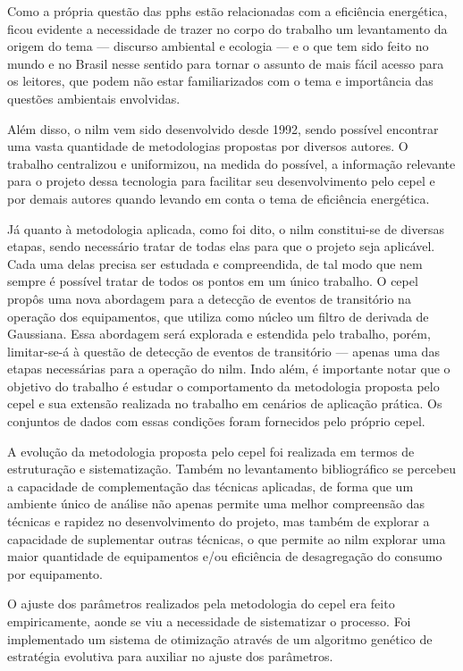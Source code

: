 Como a própria questão das \glspl{pph} estão
relacionadas com a eficiência energética, ficou evidente a necessidade
de trazer no corpo do trabalho um levantamento da origem do tema ---
discurso ambiental e ecologia --- e o que tem sido feito no mundo e no
Brasil nesse sentido para tornar o assunto de mais fácil acesso para
os leitores, que podem não estar familiarizados com o tema e
importância das questões ambientais envolvidas.

Além disso, o \acs{nilm} vem sido desenvolvido desde 1992, sendo
possível encontrar uma vasta quantidade de metodologias propostas por
diversos autores. O trabalho centralizou e uniformizou, na medida do
possível, a informação relevante para o projeto dessa tecnologia para
facilitar seu desenvolvimento pelo \acs{cepel} e por demais autores
quando levando em conta o tema de eficiência energética.

Já quanto à metodologia aplicada, como foi dito, o \acs{nilm}
constitui-se de diversas etapas, sendo necessário tratar de todas elas
para que o projeto seja aplicável. Cada uma delas precisa ser estudada
e compreendida, de tal modo que nem sempre é possível tratar de
todos os pontos em um único trabalho. O \acs{cepel} propôs uma nova
abordagem para a detecção de eventos de transitório na operação dos
equipamentos, que utiliza como núcleo um filtro de derivada de Gaussiana.
Essa abordagem será explorada e estendida pelo trabalho, porém,
limitar-se-á à questão de detecção de eventos de transitório --- apenas
uma das etapas necessárias para a operação do \acs{nilm}. Indo além, é
importante notar que o objetivo do trabalho é estudar o comportamento
da metodologia proposta pelo \acs{cepel} e sua extensão realizada no
trabalho em cenários de aplicação prática. Os conjuntos de dados com
essas condições foram fornecidos pelo próprio \acs{cepel}.

A evolução da metodologia proposta pelo \acs{cepel} foi realizada em
termos de estruturação e sistematização. Também no levantamento
bibliográfico se percebeu a capacidade de complementação das técnicas
aplicadas, de forma que um ambiente único de análise não apenas
permite uma melhor compreensão das técnicas e rapidez no
desenvolvimento do projeto, mas também de explorar a capacidade de
suplementar outras técnicas, o que permite ao \gls{nilm} explorar uma
maior quantidade de equipamentos e/ou eficiência de desagregação do
consumo por equipamento.

O ajuste dos parâmetros realizados pela metodologia do \acs{cepel} era
feito empiricamente, aonde se viu a necessidade de sistematizar o
processo. Foi implementado um sistema de otimização através de um
algoritmo genético de estratégia evolutiva para auxiliar no ajuste dos
parâmetros. 

